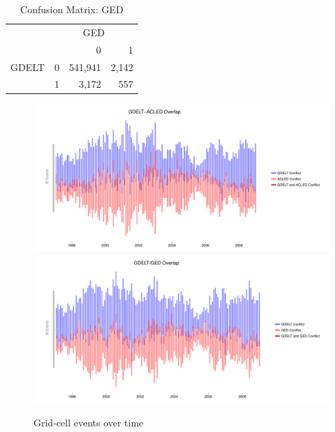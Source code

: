 \documentclass[hidelinks]{article}
\begin{document}
\begin{table}[ht]
\centering
\begin{tabular}{rrrr}
  \hline
 &  \multicolumn{3}{c}{GED}\\
& & 0 & 1 \\ 
  \hline
GDELT 	& 0 	& 541,941 & 2,142 \\ 
 		&  1 	& 3,172 & 557 \\ 
   \hline
\end{tabular}
\caption{Confusion Matrix: GED} 
\end{table}


\vfill

\newpage
\begin{figure}[!htbp]
\includegraphics[width = 1 \textwidth]{timeACLEDAppendixD4sources.pdf}\\
\includegraphics[width = 1 \textwidth]{timeGEDAppendixD4sources.pdf}
\caption{Grid-cell events over time}\label{fig:correlations_time}
\end{figure}
\end{document}
